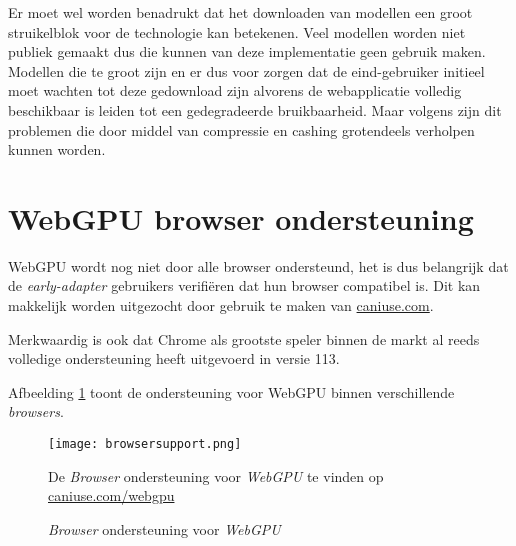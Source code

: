 \bigbreak{}

Er moet wel worden benadrukt dat het downloaden van modellen een groot struikelblok voor de technologie kan betekenen. Veel modellen worden niet publiek gemaakt dus die kunnen van deze implementatie geen gebruik maken. Modellen die te groot zijn en er dus voor zorgen dat de eind-gebruiker initieel moet wachten tot deze gedownload zijn alvorens de webapplicatie volledig beschikbaar is leiden tot een gedegradeerde bruikbaarheid. Maar volgens \textcite{Fleetwood2022} zijn dit problemen die door middel van compressie en cashing grotendeels verholpen kunnen worden.

\break{}

\section{WebGPU browser ondersteuning}

WebGPU wordt nog niet door alle browser ondersteund, het is dus belangrijk dat de \textit{early-adapter} gebruikers verifiëren dat hun browser compatibel is. Dit kan makkelijk worden uitgezocht door gebruik te maken van \href{https://caniuse.com/webgpu}{caniuse.com}.

Merkwaardig is ook dat Chrome als grootste speler binnen de markt al reeds volledige ondersteuning heeft uitgevoerd in versie 113. \autocite{Deveria2024}

\bigbreak{}

Afbeelding \ref{fig:Browser Support} toont de ondersteuning voor WebGPU binnen verschillende \textit{browsers}.

\begin{figure}
    \texttt{[image: browsersupport.png]}
    \caption{\textit{Browser} ondersteuning voor \textit{WebGPU}}{
        De \textit{Browser} ondersteuning voor \textit{WebGPU} te vinden op \href{https://caniuse.com/webgpu}{caniuse.com/webgpu}
    }
    \label{fig:Browser Support}
\end{figure}
